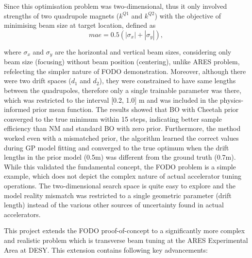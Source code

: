 Since this optimisation problem was two-dimensional, thus it only involved strengths of two quadrupole magnets ($k^{Q1}$ and $k^{Q2}$) with 
the objective of minimising beam size at target location, defined as 
\begin{equation}
\label{mae_fodo}
mae = 0.5(|\sigma_x|+|\sigma_y|),
\end{equation}

where $\sigma_x$ and $\sigma_y$ are the horizontal 
and vertical beam sizes, considering only beam size (focusing) without beam position (centering), unlike ARES problem, 
refelecting the simpler nature of FODO demonstration.
Moreover, although there were two drift spaces ($d_1$ and $d_2$), they were constrained to have same lengths between the quadrupoles, 
therefore only a single trainable parameter was there, which was restricted to the interval [0.2, 1.0] m and was included in the physics-informed 
prior mean function. The results showed that BO with Cheetah prior converged to the true minimum within 15 steps, indicating better sample efficiency 
than NM and standard BO with zero prior. Furthermore, the method worked even with a mismatched prior, the algorithm 
learned the correct values during GP model fitting and converged to the true optimum when the drift lengths in the prior model (0.5m)
was different from the ground truth (0.7m). 
While this validated the fundamental concept, the FODO problem is a simple example, which does not depict the complex nature 
of actual accelerator tuning operations. The two-dimensional search space is quite easy to explore and the model reality mismatch was 
restricted to a single geometric parameter (drift length) instead of the various other sources of uncertainty found in actual accelerators. \

This project extends the FODO proof-of-concept to a significantly more complex and realistic problem which is transverse beam tuning at the 
ARES Experimental Area at DESY. This extension contains following key advancements: \

